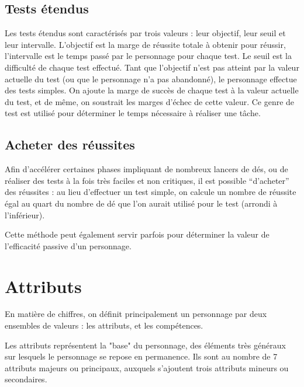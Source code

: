 \documentclass[10pt,a4paper,twocolumn]{book}
\begin{document}
\section{Tests étendus}
Les tests étendus sont caractérisés par trois valeurs : leur objectif, leur seuil et leur intervalle.
L’objectif est la marge de réussite totale à obtenir pour réussir, l’intervalle est le temps passé par le personnage pour chaque test. Le seuil est la difficulté de chaque test effectué.
Tant que l’objectif n’est pas atteint par la valeur actuelle du test (ou que le personnage n’a pas abandonné), le personnage effectue des tests simples. On ajoute la marge de succès de chaque test à la valeur actuelle du test, et de même, on soustrait les marges d’échec de cette valeur. 
Ce genre de test est utilisé pour déterminer le temps nécessaire à réaliser une tâche.
\section{Acheter des réussites}
Afin d’accélérer certaines phases impliquant de nombreux lancers de dés, ou de réaliser des tests à la fois très faciles et non critiques, il est possible “d’acheter” des réussites : au lieu d’effectuer un test simple, on calcule un nombre de réussite égal au quart du nombre de dé que l’on aurait utilisé pour le test (arrondi à l’inférieur).

Cette méthode peut également servir parfois pour déterminer la valeur de l'efficacité passive d'un personnage.
\chapter{Attributs}
En matière de chiffres, on définit principalement un personnage par deux ensembles de valeurs : les attributs, et les compétences.

Les attributs représentent la "base" du personnage, des éléments très généraux sur lesquels le personnage se repose en permanence. Ils sont au nombre de 7 attributs majeurs ou principaux, auxquels s'ajoutent trois attributs mineurs ou secondaires.
\end{document}
